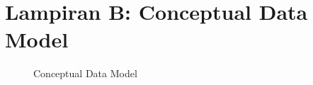 \chapter{Lampiran B: Conceptual Data Model} \label{lampiran:cdm}
\begin{figure}[H]
	\caption{Conceptual Data Model}
\end{figure}
